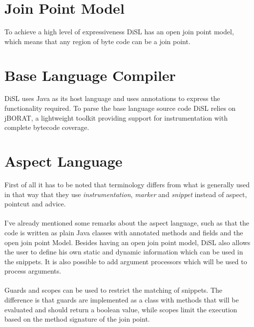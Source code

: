 \documentclass[a4paper]{report}
\begin{document}
\section{Join Point Model}
To achieve a high level of expressiveness DiSL has an open join point model, which means that any region of byte code can be a join point.

\section{Base Language Compiler}
DiSL uses Java as its host language and uses annotations to express the functionality required. To parse the base language source code DiSL relies on jBORAT, a lightweight toolkit providing support for instrumentation with complete bytecode coverage.

\section{Aspect Language}
First of all it has to be noted that terminology differs from what is generally used in that way that they use \textit{instrumentation}, \textit{marker} and \textit{snippet} instead of aspect, pointcut and advice.\\
\\
I've already mentioned some remarks about the aspect language, such as that the code is written as plain Java classes with annotated methods and fields and the open join point Model. Besides having an open join point model, DiSL also allows the user to define his own static and dynamic information which can be used in the snippets. It is also possible to add argument processors which will be used to process arguments.\\
\\
Guards and scopes can be used to restrict the matching of snippets. The difference is that guards are implemented as a class with methods that will be evaluated and should return a boolean value, while scopes limit the execution based on the method signature of the join point.
\end{document}
